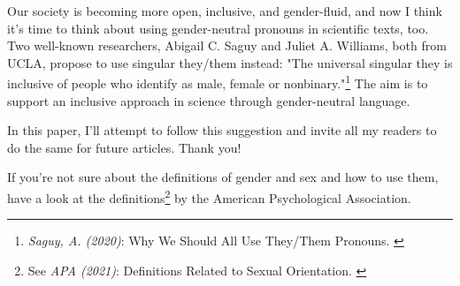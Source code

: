 Our society is becoming more open, inclusive, and gender-fluid, and now I think it's time to think about using gender-neutral pronouns in scientific texts, too. Two well-known researchers, Abigail C. Saguy and Juliet A. Williams, both from UCLA, propose to use singular they/them instead: "The universal singular they is inclusive of people who identify as male, female or nonbinary."\footnote{\textit{Saguy, A. (2020)}: Why We Should All Use They/Them Pronouns. \cite{pronouns}} The aim is to support an inclusive approach in science through gender-neutral language. 

In this paper, I'll attempt to follow this suggestion and invite all my readers to do the same for future articles. Thank you!

If you're not sure about the definitions of gender and sex and how to use them, have a look at the definitions\footnote{See \textit{APA (2021)}: Definitions Related to Sexual Orientation. \cite{apaDefinitions}} by the American Psychological Association.


